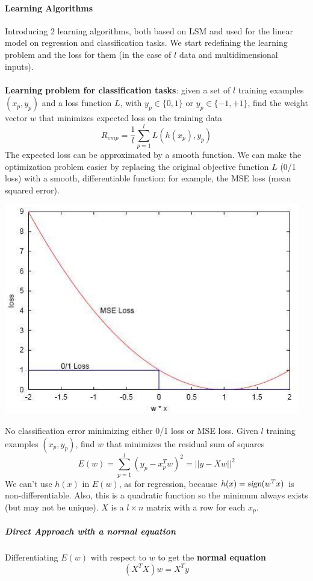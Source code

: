 \documentclass[10pt]{report}
\begin{document}
\paragraph{Learning Algorithms} Introducing 2 learning algorithms, both based on LSM and used for the linear model on regression and classification tasks. We start redefining the learning problem and the loss for them (in the case of $l$ data and multidimensional inputs).\\\\
\textbf{Learning problem for classification tasks}: given a set of $l$ training examples $(x_p, y_p)$ and a loss function $L$, with $y_p \in \{0,1\}$ or $y_p \in \{-1, +1\}$, find the weight vector $w$ that minimizes expected loss on the training data $$R_{emp} = \frac{1}{l}\sum_{p=1}^l L(h(x_p), y_p)$$
The expected loss can be approximated by a smooth function. We can make the optimization problem easier by replacing the original objective function $L$ (0/1 loss) with a smooth, differentiable function: for example, the MSE loss (mean squared error).
\begin{center}
	\includegraphics[scale=0.75]{4.png}
\end{center}
No classification error minimizing either 0/1 loss or MSE loss. Given $l$ training examples $(x_p, y_p)$, find $w$ that minimizes the residual sum of squares $$E(w)= \sum_{p=1}^l (y_p - x_p^T w)^2 = ||y - Xw||^2$$
We can't use $h(x)$ in $E(w)$, as for regression, because $h(x) = \textsl{sign}(w^T x)$ is non-differentiable. Also, this is a quadratic function so the minimum always exists (but may not be unique). $X$ is a $l\times n$ matrix with a row for each $x_p$.
\subparagraph{Direct Approach with a normal equation} Differentiating $E(w)$ with respect to $w$ to get the \textbf{normal equation} $$(X^T X)w = X^T y$$
\end{document}
